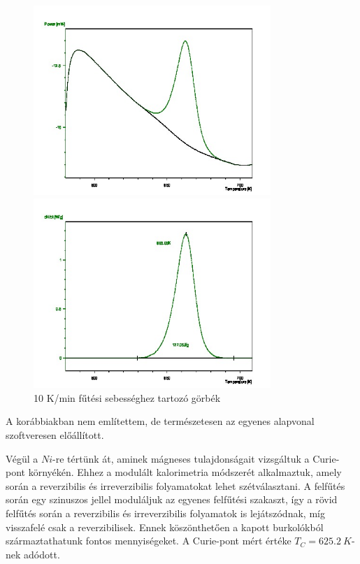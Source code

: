 \documentclass[a4paper,12pt]{article}
\begin{document}
\begin{figure}[H]
\centering
\begin{minipage}{0.49\textwidth}
\centering
\includegraphics[width=0.8\textwidth]{10outs.jpg}
\end{minipage}
\begin{minipage}{0.49\textwidth}
\centering
\includegraphics[width=0.8\textwidth]{11outs.jpg}
\end{minipage}
\caption{10 K/min fűtési sebességhez tartozó görbék}
\end{figure}

\par A korábbiakban nem említettem, de természetesen az egyenes alapvonal szoftveresen előállított.

\vspace{5mm}

\par Végül a $Ni$-re tértünk át, aminek mágneses tulajdonságait vizsgáltuk a Curie-pont környékén. Ehhez a modulált kalorimetria módszerét alkalmaztuk, amely során a reverzibilis és irreverzibilis folyamatokat lehet szétválasztani. A felfűtés során egy szinuszos jellel moduláljuk az egyenes felfűtési szakaszt, így a rövid felfűtés során a reverzibilis és irreverzibilis folyamatok is lejátszódnak, míg visszafelé csak a reverzibilisek. Ennek köszönthetően a kapott burkolókból származtathatunk fontos mennyiségeket. A Curie-pont mért értéke $T_{C} = 625.2 ~K$-nek adódott. 
\end{document}
